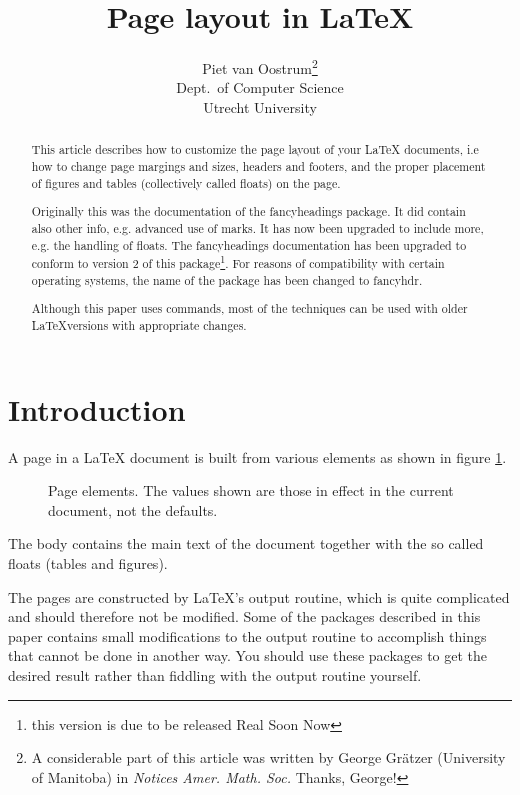 \documentclass[a4paper]{article}
\title{Page layout in \LaTeX}
\author{Piet van Oostrum\thanks{A considerable part of this article was
    written by  George
    Gr\"atzer (University of Manitoba) in \emph{Notices Amer. Math. Soc.}
    Thanks, George!}\\
  Dept.\ of Computer Science\\
  Utrecht University}
\begin{document}
\maketitle
\begin{abstract}
  This article describes how to customize the page layout of your LaTeX
  documents, i.e how to change page margings and sizes,
  headers and footers, and the
  proper placement of figures and tables (collectively called floats) on
  the page.

  Originally this was the documentation of the  \textsf{fancyheadings}
  package. It did contain also other info, e.g. advanced use of marks.
  It has now been upgraded to include more, e.g. the handling of floats.
  The fancyheadings documentation has been upgraded to conform to version 2
  of this package\footnote{this version is due to be released Real Soon Now}. For reasons of compatibility with certain operating systems, the
  name of the package has been changed to \textsf{fancyhdr}.

  Although this paper uses \LaTeXe{} commands, most of the techniques can
  be used with older \LaTeX versions with appropriate changes.
\end{abstract}
\tableofcontents


\section{Introduction}
\label{sec:intro}

A page in a \LaTeX{} document is built from various elements as shown in
figure \ref{fig:layout}.
\begin{figure}[htbp]
  \begin{center}
    \leavevmode
    \layout
    \vspace{3cm}
    \caption{Page elements. The values shown are those in effect in the current document, not the defaults.}
    \label{fig:layout}
  \end{center}
\end{figure}
\thispagestyle{plain}
The body contains the main text of the document
together with the so called floats (tables and figures).

The pages are constructed by \LaTeX's output routine, which is quite
complicated and should therefore not be modified. Some of the packages
described in this paper contains small modifications to the output routine
to accomplish things that cannot be done in another way. You should use
these packages to get the desired result rather than fiddling with the
output routine yourself.
\end{document}
